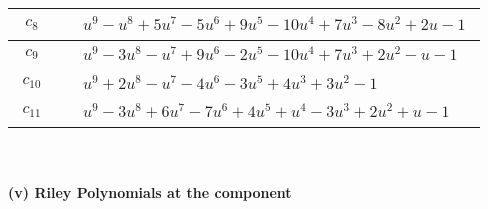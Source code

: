 \documentclass[1p]{elsarticle_modified}
\theoremstyle{definition}
\begin{document}
\begin{tabular}{m{50pt}|m{274pt}}
\hline $$\begin{aligned}c_{8}\end{aligned}$$&$\begin{aligned}
&u^9- u^8+5 u^7-5 u^6+9 u^5-10 u^4+7 u^3-8 u^2+2 u-1
\end{aligned}$\\
\hline $$\begin{aligned}c_{9}\end{aligned}$$&$\begin{aligned}
&u^9-3 u^8- u^7+9 u^6-2 u^5-10 u^4+7 u^3+2 u^2- u-1
\end{aligned}$\\
\hline $$\begin{aligned}c_{10}\end{aligned}$$&$\begin{aligned}
&u^9+2 u^8- u^7-4 u^6-3 u^5+4 u^3+3 u^2-1
\end{aligned}$\\
\hline $$\begin{aligned}c_{11}\end{aligned}$$&$\begin{aligned}
&u^9-3 u^8+6 u^7-7 u^6+4 u^5+u^4-3 u^3+2 u^2+u-1
\end{aligned}$\\
\hline
\end{tabular}\\~\\
\newpage\renewcommand{\arraystretch}{1}
\flushleft \textbf{(v) Riley Polynomials at the component}\newline \\
\end{document}
